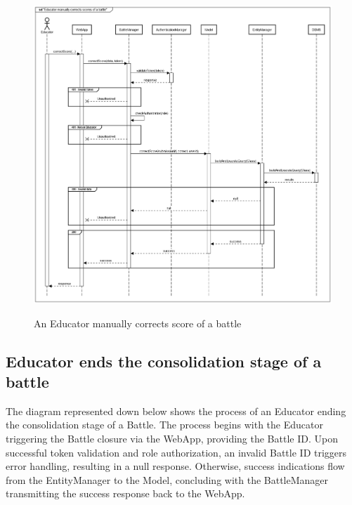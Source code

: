 \documentclass{Configuration_Files/Template}
\begin{document}
\begin{figure}[H]
\centering
\includegraphics[scale = 0.33]{Images/diagrams/sequences/educatorCorrectsScore.png}\\
\caption{An Educator manually corrects score of a battle}
\end{figure}

\subsection{Educator ends the consolidation stage of a battle}

The diagram represented down below shows the process of an Educator ending the consolidation stage of a Battle. The process begins with the Educator triggering the Battle closure via the WebApp, providing the Battle ID. Upon successful token validation and role authorization, an invalid Battle ID triggers error handling, resulting in a null response. Otherwise, success indications flow from the EntityManager to the Model, concluding with the BattleManager transmitting the success response back to the WebApp.
\end{document}
